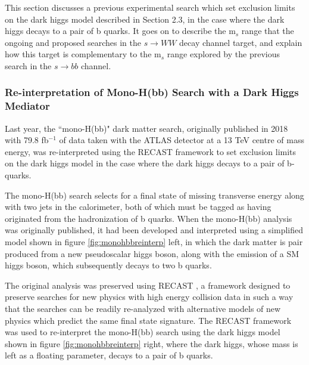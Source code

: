 \documentclass[12pt]{article}
\begin{document}
This section discusses a previous experimental search which set exclusion limits on the dark higgs model described in Section 2.3, in the case where the dark higgs decays to a pair of b quarks. It goes on to describe the m$_s$ range that the ongoing and proposed searches in the $s \rightarrow WW$ decay channel target, and explain how this target is complementary to the m$_s$ range explored by the previous search in the $s \rightarrow bb$ channel. 

\subsubsection{Re-interpretation of Mono-H(bb) Search with a Dark Higgs Mediator}

Last year, the ``mono-H(bb)" dark matter search, originally published in 2018 \cite{monohbb} with 79.8 fb$^{-1}$ of data taken with the ATLAS detector at a 13 TeV centre of mass energy, was re-interpreted \cite{monohbb_recast} using the RECAST framework \cite{recast} to set exclusion limits on the dark higgs model in the case where the dark higgs decays to a pair of b-quarks. 

The mono-H(bb) search selects for a final state of missing transverse energy along with two jets in the calorimeter, both of which must be tagged as having originated from the hadronization of b quarks. When the mono-H(bb) analysis was originally published, it had been developed and interpreted using a simplified model shown in figure \ref{fig:monohbbreinterp} left, in which the dark matter is pair produced from a new pseudoscalar higgs boson, along with the emission of a SM higgs boson, which subsequently decays to two b quarks.  

The original analysis was preserved using RECAST \cite{recast}, a framework designed to preserve searches for new physics with high energy collision data in such a way that the searches can be readily re-analyzed with alternative models of new physics which predict the same final state signature. The RECAST framework was used to re-interpret the mono-H(bb) search using the dark higgs model shown in figure \ref{fig:monohbbreinterp} right, where the dark higgs, whose mass is left as a floating parameter, decays to a pair of b quarks. 
\end{document}
